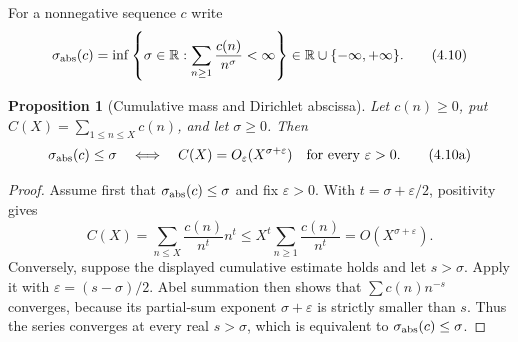 \documentclass[11pt]{article}
\newtheorem{proposition}[theorem]{Proposition}
\newcommand{\R}{\mathbb R}
\begin{document}
For a nonnegative sequence $c$ write
\[
 \sigma_{\rm abs}(c)
 =\inf\left\{\sigma\in\R:
   \sum_{n\ge1}\frac{c(n)}{n^\sigma}<\infty\right\}
 \in\R\cup\{-\infty,+\infty\}.
 \tag{4.10}
\]

\begin{proposition}[Cumulative mass and Dirichlet abscissa]
\label{prop:cumulative-abscissa}
Let $c(n)\ge0$, put $C(X)=\sum_{1\le n\le X}c(n)$, and let $\sigma\ge0$.  Then
\[
 \sigma_{\rm abs}(c)\le\sigma
 \quad\Longleftrightarrow\quad
 C(X)=O_\varepsilon(X^{\sigma+\varepsilon})
 \quad\text{for every }\varepsilon>0.
 \tag{4.10a}
\]
\end{proposition}

\begin{proof}
Assume first that $\sigma_{\rm abs}(c)\le\sigma$ and fix $\varepsilon>0$.  With
$t=\sigma+\varepsilon/2$, positivity gives
\[
 C(X)
 =\sum_{n\le X}\frac{c(n)}{n^t}n^t
 \le X^t\sum_{n\ge1}\frac{c(n)}{n^t}
 =O(X^{\sigma+\varepsilon}).
\]
Conversely, suppose the displayed cumulative estimate holds and let $s>\sigma$.  Apply it with
$\varepsilon=(s-\sigma)/2$.  Abel summation then shows that
$\sum c(n)n^{-s}$ converges, because its partial-sum exponent
$\sigma+\varepsilon$ is strictly smaller than $s$.  Thus the series converges at every real
$s>\sigma$, which is equivalent to $\sigma_{\rm abs}(c)\le\sigma$.
\end{proof}
\end{document}
